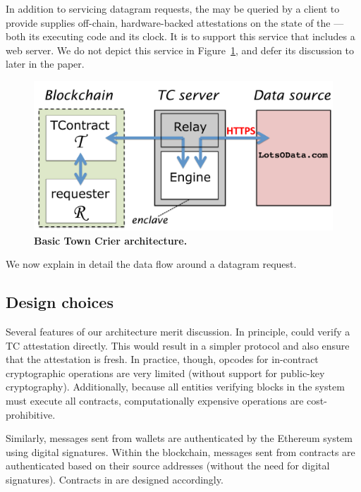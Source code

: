 In addition to servicing datagram requests, the \encname may be queried by a client to provide supplies off-chain, hardware-backed attestations on the state of the \encname---both its executing code and its clock. It is to support this service that \medname includes a web server. We do not depict this service in Figure~\ref{fig:overview}, and defer its discussion to later in the paper.

\vspace{-2mm}
\begin{figure}[h!]
\centering
\includegraphics[width=\columnwidth]{OverviewFig}
\caption{{\bf Basic Town Crier architecture.}}
\label{fig:overview}
\end{figure}
\vspace{-2mm}

We now explain in detail the data flow around a datagram request. 

\subsection{Design choices}

Several features of our architecture merit discussion. In principle, \reqcont could verify a TC attestation directly. This would result in a simpler protocol and also ensure that the attestation is fresh. In practice, though, opcodes for in-contract cryptographic operations are very limited (without support for public-key cryptography). Additionally, because all entities verifying blocks in the system must execute all contracts, computationally expensive operations are cost-prohibitive. 

Similarly, messages sent from wallets are authenticated by the Ethereum system using digital signatures. Within the blockchain, messages sent from contracts are authenticated based on their source addresses (without the need for digital signatures). Contracts in \tc are designed accordingly.

